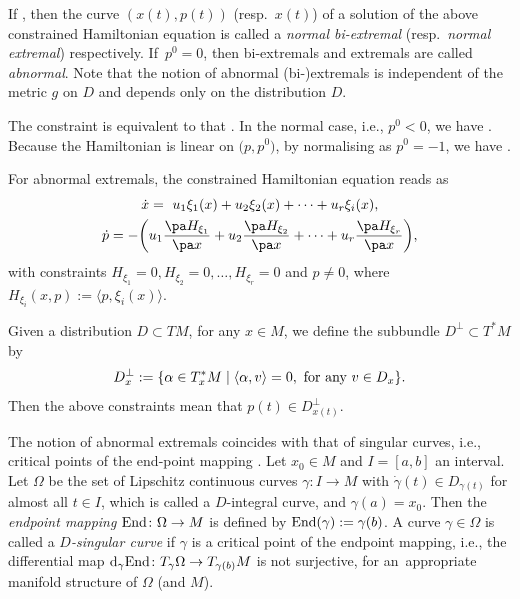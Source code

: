If , then
the curve $(x(t), p(t))$ (resp.\ $x(t)$)
of a solution of the above constrained Hamiltonian equation
is called a {\it normal bi-extremal}
(resp.\ {\it normal extremal}) respectively.
If~${p^0 = 0}$, then bi-extremals and extremals are called {\it abnormal}.
Note that the notion of abnormal \mbox{(bi-)extremals} is independent of the metric $g$ on $D$ and
depends only on the distribution $D$.

The constraint
 is equivalent to that
.
In the normal case, i.e., $p^0 < 0$, we have
. Because the Hamiltonian
is linear on $\bigl(p, p^0\bigr)$, by normalising as $p^0 = -1$, we have
.

For abnormal extremals, the constrained Hamiltonian equation reads as
\begin{gather*}
\dot{x} = \ u_1\xi_1(x) + u_2\xi_2(x) + \cdots + u_r\xi_i(x),
\\
\dot{p} = - \biggl(u_1\frac{\pa H_{\xi_1}}{\pa x} + u_2\frac{\pa H_{\xi_2}}{\pa x} + \cdots +
u_r\frac{\pa H_{\xi_r}}{\pa x}\biggr),
\end{gather*}
with constraints
$H_{\xi_1} = 0, H_{\xi_2} = 0, \dots, H_{\xi_r} = 0$ and $p \not= 0$,
where $H_{\xi_i}(x, p) := \langle p, \xi_i(x)\rangle$.

Given a distribution $D \subset TM$, for any $x \in M$, we define the subbundle $D^\perp \subset T^*M$ by
\[
D^\perp_x := \{ \alpha \in T^*_xM \mid \langle \alpha, v\rangle = 0, {\mbox{\rm\ for any\ }} v \in D_x\}.
\]
Then the above constraints mean that $p(t) \in D^\perp_{x(t)}$.

The notion of abnormal extremals coincides with that of singular curves, i.e.,
critical points of the end-point mapping \cite{Montgomery0, Montgomery}.
Let $x_0 \in M$ and $I = [a, b]$ an interval. Let
$\Omega$ be the set of Lipschitz continuous curves $\gamma\colon I \to M$ with
$\dot{\gamma}(t) \in D_{\gamma(t)}$ for almost all $t \in I$, which is called a $D$-integral curve,
and $\gamma(a) = x_0$.
Then the {\it endpoint mapping}
${\rm End}\colon \Omega \to M$
is defined by ${\rm End}(\gamma) := \gamma(b)$.
A curve $\gamma \in \Omega$ is called a {\it $D$-singular curve} if $\gamma$ is
a critical point of the endpoint mapping,
i.e., the differential map
${\rm d}_{\gamma}{\rm End}\colon T_{\gamma}\Omega \to T_{\gamma(b)}M$
is not surjective, for an~appropriate manifold structure of $\Omega$ (and $M$).


